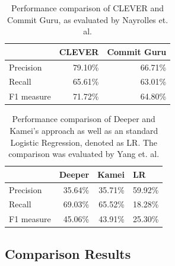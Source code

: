 \begin{table}[t]
	\centering
	\caption{Performance comparison of CLEVER and Commit Guru, as evaluated by Nayrolles et. al. \cite{Nayrolles2018}}
	\begin{tabular}{@{}lrr@{}}
		\toprule
		& \multicolumn{1}{l}{CLEVER} & \multicolumn{1}{l}{Commit Guru} \\ \midrule
		Precision  & 79.10\%                    & 66.71\%                         \\
		Recall     & 65.61\%                    & 63.01\%                         \\
		F1 measure & 71.72\%                    & 64.80\%                         \\ \bottomrule
	\end{tabular}
	\label{tab:perfclever}
\end{table}

\begin{table}[t]
	\centering
	\caption{Performance comparison of Deeper and Kamei's approach as well as an standard Logistic Regression, denoted as LR. The comparison was evaluated by Yang et. al. \cite{Yang2015}}
	\begin{tabular}{@{}lrrr@{}}
		\toprule
		& \multicolumn{1}{l}{Deeper} & \multicolumn{1}{l}{Kamei} & \multicolumn{1}{l}{LR} \\ \midrule
		Precision  & 35.64\%                    & 35.71\%                   & 59.92\%                \\
		Recall     & 69.03\%                    & 65.52\%                   & 18.28\%                \\
		F1 measure & 45.06\%                    & 43.91\%                   & 25.30\%                \\ \bottomrule
	\end{tabular}
	\label{tab:perfdeeper}
\end{table}



\subsection{Comparison Results}

